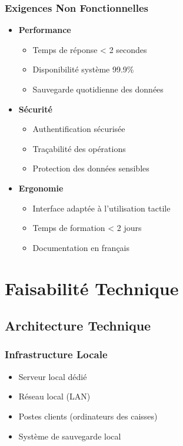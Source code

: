 \documentclass[14pt,a4paper]{report}
\begin{document}
\subsection{Exigences Non Fonctionnelles}
\begin{itemize}
    \item \textbf{Performance}
        \begin{itemize}
            \item Temps de réponse < 2 secondes
            \item Disponibilité système 99.9\%
            \item Sauvegarde quotidienne des données
        \end{itemize}
    \item \textbf{Sécurité}
        \begin{itemize}
            \item Authentification sécurisée
            \item Traçabilité des opérations
            \item Protection des données sensibles
        \end{itemize}
    \item \textbf{Ergonomie}
        \begin{itemize}
            \item Interface adaptée à l'utilisation tactile
            \item Temps de formation < 2 jours
            \item Documentation en français
        \end{itemize}
\end{itemize}

\chapter{Faisabilité Technique}

\section{Architecture Technique}
\subsection{Infrastructure Locale}
\begin{itemize}
    \item Serveur local dédié
    \item Réseau local (LAN)
    \item Postes clients (ordinateurs des caisses)
    \item Système de sauvegarde local
\end{itemize}
\end{document}
